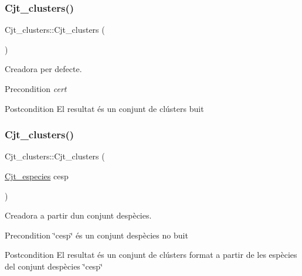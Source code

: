 \subsubsection{\texorpdfstring{Cjt\+\_\+clusters()}{Cjt\_clusters()}\hspace{0.1cm}{\footnotesize\ttfamily [1/2]}}
{\footnotesize\ttfamily Cjt\+\_\+clusters\+::\+Cjt\+\_\+clusters (\begin{DoxyParamCaption}{ }\end{DoxyParamCaption})}



Creadora per defecte. 

\begin{DoxyPrecond}{Precondition}
{\itshape cert} 
\end{DoxyPrecond}
\begin{DoxyPostcond}{Postcondition}
El resultat és un conjunt de clústers buit 
\end{DoxyPostcond}
\mbox{\label{class_cjt__clusters_aa52c1e5013ed206efccd70aaba9c037c}} 
\subsubsection{\texorpdfstring{Cjt\+\_\+clusters()}{Cjt\_clusters()}\hspace{0.1cm}{\footnotesize\ttfamily [2/2]}}
{\footnotesize\ttfamily Cjt\+\_\+clusters\+::\+Cjt\+\_\+clusters (\begin{DoxyParamCaption}\item[{\hyperlink{class_cjt__especies}{Cjt\+\_\+especies}}]{cesp }\end{DoxyParamCaption})}



Creadora a partir d\textquotesingle{}un conjunt d\textquotesingle{}espècies. 

\begin{DoxyPrecond}{Precondition}
\char`\"{}cesp\char`\"{} és un conjunt d\textquotesingle{}espècies no buit 
\end{DoxyPrecond}
\begin{DoxyPostcond}{Postcondition}
El resultat és un conjunt de clústers format a partir de les espècies del conjunt d\textquotesingle{}espècies \char`\"{}cesp\char`\"{} 
\end{DoxyPostcond}
\mbox{\label{class_cjt__clusters_aba7f00077ce77ba7963ac8084be4a000}} 
